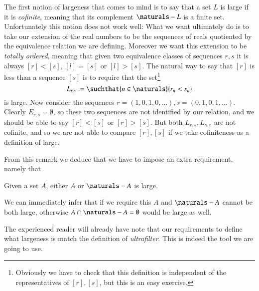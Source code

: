 \documentclass[adraft, copyright,creativecommons,sharealike,noncommercial]{eptcs}
\begin{document}
\begin{remark}
	The first notion of largeness that comes to mind is to say that a set $L$ is large if it is \emph{cofinite}, meaning that its complement $\naturals - L$ is a finite set. Unfortunately this notion does not work well: What we want ultimately do is to take our extension of the real numbers to be the sequences of reals quotiented by the equivalence relation we are defining. Moreover we want this extension to be \emph{totally ordered}, meaning that given two equivalence classes of sequences $r,s$ it is always $[r] < [s]$, $[l] = [s]$ or $[l] > [s]$. The natural way to say that $[r]$ is less than a sequence $[s]$ is to require that the set\footnote{Obviously we have to check that this definition is independent of the representatives of $[r], [s]$, but this is an easy exercise.}
	\begin{equation*}
		L_{r,s} : = \suchthat{n \in \naturals}{r_n < s_n}
	\end{equation*}
	is large. Now consider the sequences $r = (1,0,1,0, \dots), s=(0,1,0,1,\dots)$. Clearly $E_{r,s} = \emptyset$, so these two sequences are not identified by our relation, and we should be able to say $[r] < [s]$ or $[r] > [s]$. But both $L_{r,s}, L_{s,r}$ are not cofinite, and so we are not able to compare $[r],[s]$ if we take cofiniteness as a definition of large. 
\end{remark}
	From this remark we deduce that we have to impose an extra requirement, namely that
	\begin{center}
		Given a set $A$, either $A$ or $\naturals - A$ is large.
	\end{center}
	We can immediately infer that if we require this $A$ and $\naturals - A$ cannot be both large, otherwise $A \cap \naturals - A = \emptyset$ would be large as well.
	
	The experienced reader will already have note that our requirements to define what largeness is match the definition of \emph{ultrafilter}. This is indeed the tool we are going to use.
	
\end{document}
